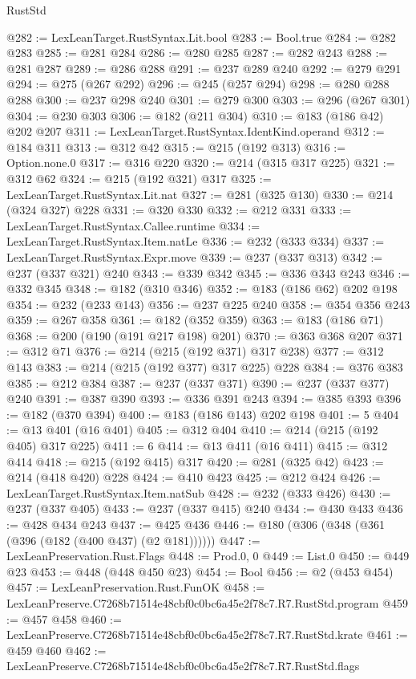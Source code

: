 \begin{lexlean}{RustStd}
\begin{coremodule}
@282 := LexLeanTarget.RustSyntax.Lit.bool
@283 := Bool.true
@284 := @282 @283
@285 := @281 @284
@286 := @280 @285
@287 := @282 @243
@288 := @281 @287
@289 := @286 @288
@291 := @237 @289 @240
@292 := @279 @291
@294 := @275 (@267 @292)
@296 := @245 (@257 @294)
@298 := @280 @288 @288
@300 := @237 @298 @240
@301 := @279 @300
@303 := @296 (@267 @301)
@304 := @230 @303
@306 := @182 (@211 @304)
@310 := @183 (@186 @42) @202 @207
@311 := LexLeanTarget.RustSyntax.IdentKind.operand
@312 := @184 @311
@313 := @312 @42
@315 := @215 (@192 @313)
@316 := Option.none.{0}
@317 := @316 @220
@320 := @214 (@315 @317 @225)
@321 := @312 @62
@324 := @215 (@192 @321) @317
@325 := LexLeanTarget.RustSyntax.Lit.nat
@327 := @281 (@325 @130)
@330 := @214 (@324 @327) @228
@331 := @320 @330
@332 := @212 @331
@333 := LexLeanTarget.RustSyntax.Callee.runtime
@334 := LexLeanTarget.RustSyntax.Item.natLe
@336 := @232 (@333 @334)
@337 := LexLeanTarget.RustSyntax.Expr.move
@339 := @237 (@337 @313)
@342 := @237 (@337 @321) @240
@343 := @339 @342
@345 := @336 @343 @243
@346 := @332 @345
@348 := @182 (@310 @346)
@352 := @183 (@186 @62) @202 @198
@354 := @232 (@233 @143)
@356 := @237 @225 @240
@358 := @354 @356 @243
@359 := @267 @358
@361 := @182 (@352 @359)
@363 := @183 (@186 @71)
@368 := @200 (@190 (@191 @217 @198) @201)
@370 := @363 @368 @207
@371 := @312 @71
@376 := @214 (@215 (@192 @371) @317 @238)
@377 := @312 @143
@383 := @214 (@215 (@192 @377) @317 @225) @228
@384 := @376 @383
@385 := @212 @384
@387 := @237 (@337 @371)
@390 := @237 (@337 @377) @240
@391 := @387 @390
@393 := @336 @391 @243
@394 := @385 @393
@396 := @182 (@370 @394)
@400 := @183 (@186 @143) @202 @198
@401 := 5
@404 := @13 @401 (@16 @401)
@405 := @312 @404
@410 := @214 (@215 (@192 @405) @317 @225)
@411 := 6
@414 := @13 @411 (@16 @411)
@415 := @312 @414
@418 := @215 (@192 @415) @317
@420 := @281 (@325 @42)
@423 := @214 (@418 @420) @228
@424 := @410 @423
@425 := @212 @424
@426 := LexLeanTarget.RustSyntax.Item.natSub
@428 := @232 (@333 @426)
@430 := @237 (@337 @405)
@433 := @237 (@337 @415) @240
@434 := @430 @433
@436 := @428 @434 @243
@437 := @425 @436
@446 := @180 (@306 (@348 (@361 (@396 (@182 (@400 @437) (@2 @181))))))
@447 := LexLeanPreservation.Rust.Flags
@448 := Prod.{0, 0}
@449 := List.{0}
@450 := @449 @23
@453 := @448 (@448 @450 @23)
@454 := Bool
@456 := @2 (@453 @454)
@457 := LexLeanPreservation.Rust.FunOK
@458 := LexLeanPreserve.C7268b71514e48cbf0c0bc6a45e2f78c7.R7.RustStd.program
@459 := @457 @458
@460 := LexLeanPreserve.C7268b71514e48cbf0c0bc6a45e2f78c7.R7.RustStd.krate
@461 := @459 @460
@462 := LexLeanPreserve.C7268b71514e48cbf0c0bc6a45e2f78c7.R7.RustStd.flags

\end{coremodule}
\end{lexlean}
